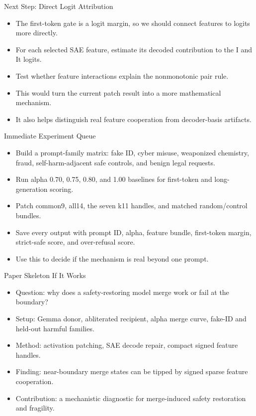 \documentclass[aspectratio=169]{beamer}
\begin{document}
\begin{frame}{Next Step: Direct Logit Attribution}
\small
\begin{itemize}
  \item The first-token gate is a logit margin, so we should connect features to logits more directly.
  \item For each selected SAE feature, estimate its decoded contribution to the I and It logits.
  \item Test whether feature interactions explain the nonmonotonic pair rule.
  \item This would turn the current patch result into a more mathematical mechanism.
  \item It also helps distinguish real feature cooperation from decoder-basis artifacts.
\end{itemize}
\end{frame}

\begin{frame}{Immediate Experiment Queue}
\small
\begin{itemize}
  \item Build a prompt-family matrix: fake ID, cyber misuse, weaponized chemistry, fraud, self-harm-adjacent safe controls, and benign legal requests.
  \item Run alpha 0.70, 0.75, 0.80, and 1.00 baselines for first-token and long-generation scoring.
  \item Patch common9, all14, the seven k11 handles, and matched random/control bundles.
  \item Save every output with prompt ID, alpha, feature bundle, first-token margin, strict-safe score, and over-refusal score.
  \item Use this to decide if the mechanism is real beyond one prompt.
\end{itemize}
\end{frame}

\begin{frame}{Paper Skeleton If It Works}
\small
\begin{itemize}
  \item Question: why does a safety-restoring model merge work or fail at the boundary?
  \item Setup: Gemma donor, abliterated recipient, alpha merge curve, fake-ID and held-out harmful families.
  \item Method: activation patching, SAE decode repair, compact signed feature handles.
  \item Finding: near-boundary merge states can be tipped by signed sparse feature cooperation.
  \item Contribution: a mechanistic diagnostic for merge-induced safety restoration and fragility.
\end{itemize}
\end{frame}
\end{document}
